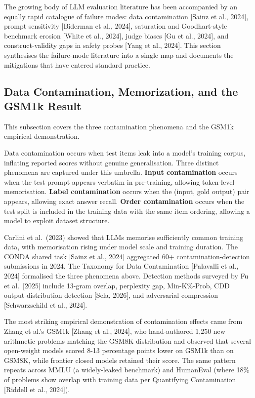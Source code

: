 The growing body of LLM evaluation literature has been accompanied by an equally rapid catalogue of failure modes: data contamination {[}Sainz et al., 2024{]}, prompt sensitivity {[}Biderman et al., 2024{]}, saturation and Goodhart-style benchmark erosion {[}White et al., 2024{]}, judge biases {[}Gu et al., 2024{]}, and construct-validity gaps in safety probes {[}Yang et al., 2024{]}. This section synthesises the failure-mode literature into a single map and documents the mitigations that have entered standard practice.

\subsection{Data Contamination, Memorization, and the GSM1k Result}\label{data-contamination-memorization-and-the-gsm1k-result}

This subsection covers the three contamination phenomena and the GSM1k empirical demonstration.

Data contamination occurs when test items leak into a model's training corpus, inflating reported scores without genuine generalisation. Three distinct phenomena are captured under this umbrella. \textbf{Input contamination} occurs when the test prompt appears verbatim in pre-training, allowing token-level memorisation. \textbf{Label contamination} occurs when the (input, gold output) pair appears, allowing exact answer recall. \textbf{Order contamination} occurs when the test split is included in the training data with the same item ordering, allowing a model to exploit dataset structure.

Carlini et al.~(2023) showed that LLMs memorise sufficiently common training data, with memorisation rising under model scale and training duration. The CONDA shared task {[}Sainz et al., 2024{]} aggregated 60+ contamination-detection submissions in 2024. The Taxonomy for Data Contamination {[}Palavalli et al., 2024{]} formalised the three phenomena above. Detection methods surveyed by Fu et al.~{[}2025{]} include 13-gram overlap, perplexity gap, Min-K\%-Prob, CDD output-distribution detection {[}Sela, 2026{]}, and adversarial compression {[}Schwarzschild et al., 2024{]}.

The most striking empirical demonstration of contamination effects came from Zhang et al.'s GSM1k {[}Zhang et al., 2024{]}, who hand-authored 1,250 new arithmetic problems matching the GSM8K distribution and observed that several open-weight models scored 8-13 percentage points lower on GSM1k than on GSM8K, while frontier closed models retained their score. The same pattern repeats across MMLU (a widely-leaked benchmark) and HumanEval (where 18\% of problems show overlap with training data per Quantifying Contamination {[}Riddell et al., 2024{]}).


